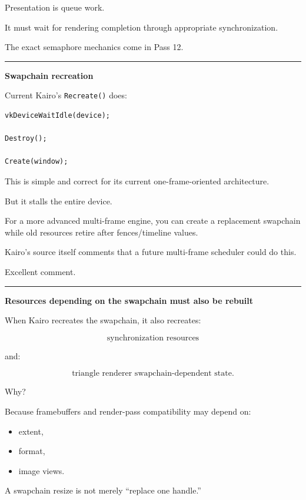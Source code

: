 Presentation is queue work.

It must wait for rendering completion through appropriate synchronization.

The exact semaphore mechanics come in Pass 12.

\begin{center}\rule{0.5\linewidth}{0.5pt}\end{center}

\textbf{Swapchain recreation}

Current Kairo's \texttt{Recreate()} does:

\begin{verbatim}
vkDeviceWaitIdle(device);

Destroy();

Create(window);
\end{verbatim}

This is simple and correct for its current one-frame-oriented architecture.

But it stalls the entire device.

For a more advanced multi-frame engine, you can create a replacement swapchain while old resources retire after fences/timeline values.

Kairo's source itself comments that a future multi-frame scheduler could do this.

Excellent comment.

\begin{center}\rule{0.5\linewidth}{0.5pt}\end{center}

\textbf{Resources depending on the swapchain must also be rebuilt}

When Kairo recreates the swapchain, it also recreates:

\[
\text{synchronization resources}
\]

and:

\[
\text{triangle renderer swapchain-dependent state}.
\]

Why?

Because framebuffers and render-pass compatibility may depend on:

\begin{itemize}
\tightlist
\item
  extent,
\item
  format,
\item
  image views.
\end{itemize}

A swapchain resize is not merely ``replace one handle.''

